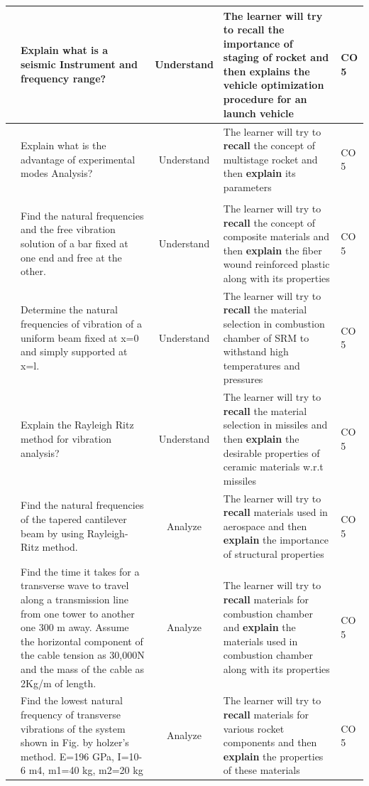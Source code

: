 \documentclass[11pt,paper=a4,answers]{exam}
\begin{document}
\begin{flushleft}
\begin{longtable}{|>{\centering\arraybackslash}p{0.8cm}  | >{\raggedright\arraybackslash}p{6.5cm}  | c | >{\raggedright\arraybackslash}p{5cm} |>{\centering\arraybackslash}p{1cm}|}
	\hline
	9&Explain what is a seismic Instrument and frequency range?&	Understand&	The learner will try to \textbf{recall} the importance of staging of rocket  and then \textbf{explain}s the vehicle optimization procedure for an launch vehicle&	CO 5\\
	\hline
	10&	Explain what is the advantage of experimental modes Analysis?&	Understand&	The learner will try to \textbf{recall} the concept of multistage rocket and then \textbf{explain} its  parameters&	CO 5\\
	\hline
	\multicolumn{5}{| c |}{\textcolor{red}{ \textbf{PART-B LONG ANSWER QUESTIONS}}}\\
	\hline
	1&	Find the natural frequencies and the free vibration solution of a bar fixed at one end and free at the other.&	Understand&	The learner will try to \textbf{recall} the concept of composite materials and then \textbf{explain} the fiber wound reinforced plastic along with its properties&	CO 5\\
	\hline
	2&	Determine the natural frequencies of vibration of a uniform beam fixed at x=0 and simply supported at x=l.&	Understand&	The learner will try to \textbf{recall} the material selection in combustion chamber of SRM to withstand high temperatures and pressures&	CO 5\\
	\hline
	3&	Explain the Rayleigh Ritz method for vibration analysis?&	Understand&	The learner will try to \textbf{recall} the material selection in missiles and then \textbf{explain} the desirable properties of ceramic materials w.r.t missiles&	CO 5\\
	\hline
	4&	Find the natural frequencies of the tapered cantilever beam by using Rayleigh-Ritz method.&	Analyze&The learner will try to \textbf{recall} materials used in aerospace and then \textbf{explain} the importance of structural properties&	CO 5\\
	\hline
	5&	Find the time it takes for a transverse wave to travel along a transmission line from one tower to another one 300 m away. Assume the horizontal component of the cable tension as 30,000N and the mass of the cable as 2Kg/m of length.&	Analyze&	The learner will try to \textbf{recall} materials for combustion chamber and \textbf{explain} the materials used in combustion chamber along with its properties&	CO 5\\
	\hline
	6&	Find the lowest natural frequency of transverse vibrations of the system shown in Fig. by holzer’s method. E=196 GPa, I=10-6 m4, m1=40 kg, m2=20 kg&	Analyze&	The learner will try to \textbf{recall} materials for various rocket components and then \textbf{explain} the properties of these materials&	CO 5\\

\end{longtable}
\end{flushleft}
\end{document}
